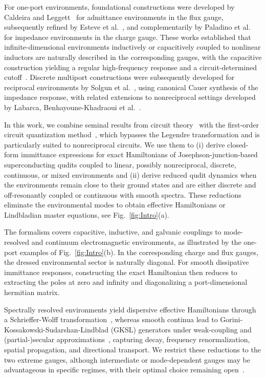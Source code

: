 \documentclass[prx,aps,twocolumn,article]{revtex4-2}
\begin{document}
For one-port environments, foundational constructions were developed by Caldeira and 
Leggett~\cite{CaldeiraLeggett_QT:1983} for admittance environments in the flux gauge, subsequently refined by Esteve et al.~\cite{Esteve:1986}, and complementarily by Paladino et al.~\cite{Paladino:2003} for impedance environments in the charge gauge. These works established that infinite-dimensional environments inductively or capacitively coupled to nonlinear inductors are naturally described in the corresponding gauges, with the capacitive construction yielding a regular high-frequency response and a circuit-determined cutoff~\cite{Paladino:2003}. Discrete multiport constructions were subsequently developed for reciprocal environments by Solgun et al.~\cite{Solgun:2015,Solgun:2019}, using canonical Cauer synthesis of the impedance response, with related extensions to nonreciprocal settings developed by Labarca, Benhayoune-Khadraoui et al.~\cite{Labarca:2024}.

In this work, we combine seminal results from circuit theory~\cite{Foster:1924,Cauer:1926,Brune:1931,Belevitch:1950,Newcomb:1966,Solgun:2015}
with the first-order circuit quantization method~\cite{ParraRodriguez:2024,Osborne:2024,ParraRodriguez:2025}, which bypasses the Legendre transformation and is particularly suited to nonreciprocal circuits. We use them to (i) derive closed-form immittance expressions for exact Hamiltonians of Josephson-junction-based superconducting qudits coupled to linear, possibly nonreciprocal, discrete, continuous, or mixed environments and (ii) derive reduced qudit dynamics when the environments remain close to their ground states and are either discrete and off-resonantly coupled or continuous with smooth spectra.
These reductions eliminate the environmental modes to obtain effective Hamiltonians or Lindbladian master equations, see Fig.~\ref{fig:Intro}(a).

The formalism covers capacitive, inductive, and galvanic couplings to mode-resolved and continuum electromagnetic environments, as illustrated by the one-port examples of Fig.~\ref{fig:Intro}(b). In the corresponding charge and flux gauges, the dressed environmental sector is naturally diagonal. For smooth dissipative immittance responses, constructing the exact Hamiltonian then reduces to extracting the poles at zero and infinity and diagonalizing a port-dimensional hermitian matrix.

Spectrally resolved environments yield dispersive effective Hamiltonians through a Schrieffer-Wolff transformation~\cite{Schrieffer:1966,Bravyi:2011}, whereas smooth continua lead to Gorini-Kossakowski-Sudarshan-Lindblad (GKSL) generators under weak-coupling and (partial-)secular approximations~\cite{Davies:1974,BreuerPetruccione:2002}, capturing decay, frequency renormalization, spatial propagation, and directional transport. We restrict these reductions to the two extreme gauges, although intermediate or mode-dependent gauges may be advantageous in specific regimes, with their optimal choice remaining open~\cite{Manucharyan:2017,DeBernardis:2018,Roth:2019,Stokes:2019,DiStefano:2019,Mehta:2022,Arwas:2023}.
\end{document}
